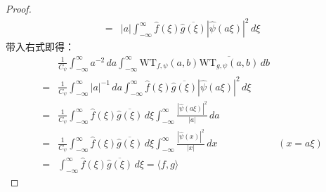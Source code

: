 \begin{proof}
\begin{align*}
        =&|a|\int_{-\infty}^{\infty}\hat{f}(\xi)\overline{\hat{g}(\xi)}|\hat{\psi}(a\xi)|^2\,d\xi
    \end{align*}
    带入右式即得：
    \begin{align*}
        &\frac{1}{C_{\psi}}\int_{-\infty}^{\infty}a^{-2}\,da\int_{-\infty}^{\infty}\mathrm{WT} _{f,\psi}(a,b)\overline{\mathrm{WT} _{g,\psi}(a,b)}\,db\\
        =&\frac{1}{C_{\psi}}\int_{-\infty}^{\infty}|a|^{-1}\,da\int_{-\infty}^{\infty}\hat{f}(\xi)\overline{\hat{g}(\xi)}|\hat{\psi}(a\xi)|^2\,d\xi\\
        =&\frac{1}{C_{\psi}}\int_{-\infty}^{\infty}\hat{f}(\xi)\overline{\hat{g}(\xi)}\,d\xi\int_{-\infty}^{\infty}\frac{|\hat{\psi}(a\xi)|^2}{|a|}\,da\\
        =&\frac{1}{C_{\psi}}\int_{-\infty}^{\infty}\hat{f}(\xi)\overline{\hat{g}(\xi)}\,d\xi\int_{-\infty}^{\infty}\frac{|\hat{\psi}(x)|^2}{|x|}\,dx&(x=a\xi)\\
        =&\int_{-\infty}^{\infty}\hat{f}(\xi)\overline{\hat{g}(\xi)}\,d\xi=\langle f,g\rangle
    \end{align*}
\end{proof}

